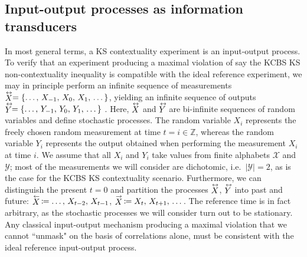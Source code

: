 \subsection{Input-output processes as information transducers}
In most general terms, a KS contextuality experiment is an input-output process. To verify that an experiment producing a maximal violation of say the KCBS KS non-contextuality inequality is compatible with the ideal reference experiment, we may in principle perform an infinite sequence of measurements  $\oset{\leftrightarrow}{X}=\{\dots,\thinspace X_{-1},\thinspace X_{0},\thinspace X_{1},\thinspace\dots\}$, yielding an infinite sequence of outputs $\oset{\leftrightarrow}{Y}=\{\dots,\thinspace Y_{-1},\thinspace Y_{0},\thinspace Y_{1},\thinspace \dots\}$ \cite{Cabello2018}. Here, $\oset{\leftrightarrow}{X}$ and $\oset{\leftrightarrow}{Y}$ are bi-infinite sequences of random variables and define stochastic processes. The random variable $X_{i}$ represents the freely chosen random measurement at time $t=i\in\mathbb{Z}$, whereas the random variable $Y_{i}$ represents the output obtained when performing the measurement $X_{i}$ at time $i$. We assume that all $X_i$ and $Y_i$ take values from finite alphabets $\mathcal{X}$ and $\mathcal{Y}$; most of the measurements we will consider are dichotomic, i.e.\ $\vert\mathcal{Y}\vert=2$, as is the case for the KCBS KS contextuality scenario. Furthermore, we can distinguish the present $t=0$ and partition the processes $\oset{\leftrightarrow}{X}$, $\oset{\leftrightarrow}{Y}$ into past and future: $\oset{\leftarrow}{X}\thinspace\coloneqq \dots,\thinspace X_{t-2},\thinspace X_{t-1}$, $\oset{\rightarrow}{X}\thinspace\coloneqq X_t,\thinspace X_{t+1},\thinspace \dots$. The reference time is in fact arbitrary, as the stochastic processes we will consider turn out to be stationary. Any classical input-output mechanism producing a maximal violation that we cannot ``unmask" on the basis of correlations alone, must be consistent with the ideal reference input-output process.

